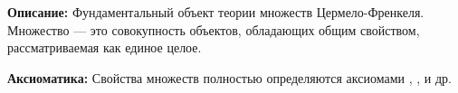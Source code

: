 

\hypertarget{obj-set}{}
\hypertarget{obj-set}{}
\begin{object} %
\textbf{Описание:}
Фундаментальный объект теории множеств Цермело-Френкеля. Множество — это совокупность объектов, обладающих общим свойством, рассматриваемая как единое целое.

\textbf{Аксиоматика:}
Свойства множеств полностью определяются аксиомами , ,  и др.
\end{object}